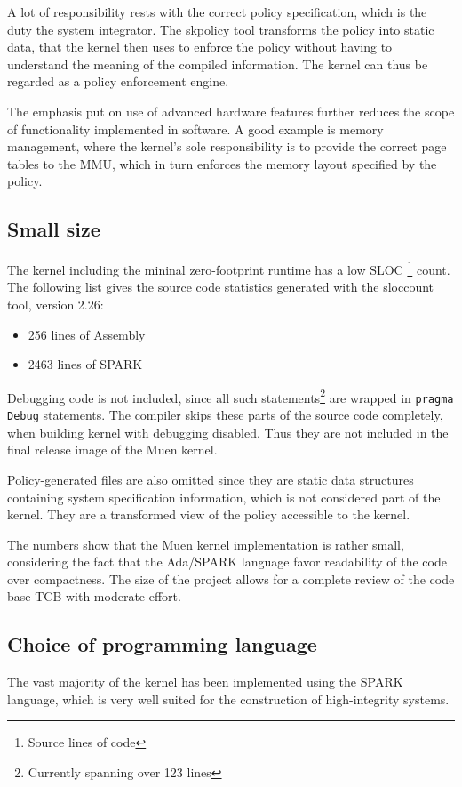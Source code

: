 A lot of responsibility rests with the correct policy specification, which is
the duty the system integrator. The skpolicy tool transforms the policy into
static data, that the kernel then uses to enforce the policy without having to
understand the meaning of the compiled information. The kernel can thus be
regarded as a policy enforcement engine.

The emphasis put on use of advanced hardware features further reduces the scope
of functionality implemented in software. A good example is memory management,
where the kernel's sole responsibility is to provide the correct page tables to
the MMU, which in turn enforces the memory layout specified by the policy.

\subsection{Small size}
The kernel including the mininal zero-footprint runtime has a low SLOC
\footnote{Source lines of code} count. The following list gives the source code
statistics generated with the sloccount tool, version 2.26:

\begin{itemize}
	\item 256 lines of Assembly
	\item 2463 lines of SPARK
\end{itemize}

Debugging code is not included, since all such statements\footnote{Currently
spanning over 123 lines} are wrapped in \texttt{pragma Debug} statements. The
compiler skips these parts of the source code completely, when building kernel
with debugging disabled. Thus they are not included in the final release image
of the Muen kernel.

Policy-generated files are also omitted since they are static data structures
containing system specification information, which is not considered part of the
kernel. They are a transformed view of the policy accessible to the kernel.

The numbers show that the Muen kernel implementation is rather small,
considering the fact that the Ada/SPARK language favor readability of the code
over compactness. The size of the project allows for a complete review of the
code base TCB with moderate effort.

\subsection{Choice of programming language}
The vast majority of the kernel has been implemented using the SPARK language,
which is very well suited for the construction of high-integrity systems.

